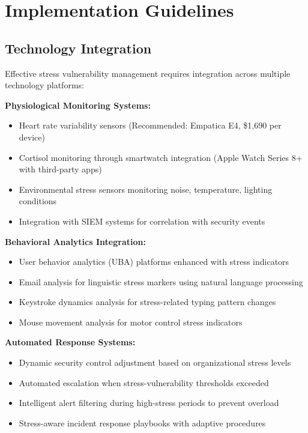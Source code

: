 \documentclass[11pt,a4paper]{article}
\begin{document}
\section{Implementation Guidelines}

\subsection{Technology Integration}

Effective stress vulnerability management requires integration across multiple technology platforms:

\textbf{Physiological Monitoring Systems:}
\begin{itemize}
\item Heart rate variability sensors (Recommended: Empatica E4, \$1,690 per device)
\item Cortisol monitoring through smartwatch integration (Apple Watch Series 8+ with third-party apps)
\item Environmental stress sensors monitoring noise, temperature, lighting conditions
\item Integration with SIEM systems for correlation with security events
\end{itemize}

\textbf{Behavioral Analytics Integration:}
\begin{itemize}
\item User behavior analytics (UBA) platforms enhanced with stress indicators
\item Email analysis for linguistic stress markers using natural language processing
\item Keystroke dynamics analysis for stress-related typing pattern changes
\item Mouse movement analysis for motor control stress indicators
\end{itemize}

\textbf{Automated Response Systems:}
\begin{itemize}
\item Dynamic security control adjustment based on organizational stress levels
\item Automated escalation when stress-vulnerability thresholds exceeded
\item Intelligent alert filtering during high-stress periods to prevent overload
\item Stress-aware incident response playbooks with adaptive procedures
\end{itemize}
\end{document}
